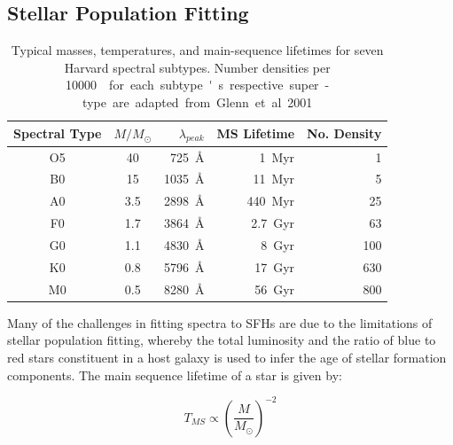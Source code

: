 \documentclass[a4paper,11pt]{article}
\begin{document}
\subsection{Stellar Population Fitting}\label{sec:stellar_population_fitting}

\begin{table}
  \centering
  \begin{tabular}{c c r r r}
    Spectral Type & $M/M_\odot$ & $\lambda_{peak}$     & MS Lifetime   & No. Density \\
    \hline \hline
    O5            &	40          & \SI{725}{\angstrom}  & \SI{1}{Myr}   & 1           \\
    B0            &	15          & \SI{1035}{\angstrom} & \SI{11}{Myr}  & 5           \\
    A0            &	3.5         & \SI{2898}{\angstrom} & \SI{440}{Myr} & 25          \\
    F0            &	1.7         & \SI{3864}{\angstrom} & \SI{2.7}{Gyr} & 63          \\
    G0            &	1.1         & \SI{4830}{\angstrom} & \SI{8}{Gyr}   & 100         \\
    K0            &	0.8         & \SI{5796}{\angstrom} & \SI{17}{Gyr}  & 630         \\
    M0            &	0.5         & \SI{8280}{\angstrom} & \SI{56}{Gyr}  & 800         \\
    \hline
  \end{tabular}
  \caption{Typical masses, temperatures, and main-sequence lifetimes for seven Harvard spectral subtypes. Number densities per \SI{10000}{\cubic\parsec} for each subtype's respective super-type are adapted from Glenn et al. 2001.\cite{Glenn_2001}}
  \label{tab:star_lifetimes_densities}
\end{table}

Many of the challenges in fitting spectra to SFHs are due to the limitations of stellar population fitting, whereby the total luminosity and the ratio of blue to red stars constituent in a host galaxy is used to infer the age of stellar formation components. The main sequence lifetime of a star is given by\cite{Prialnik_2010}:

\begin{equation}
  T_{MS} \propto \left(\frac{M}{M_\odot}\right)^{-2}
\end{equation}
\end{document}
